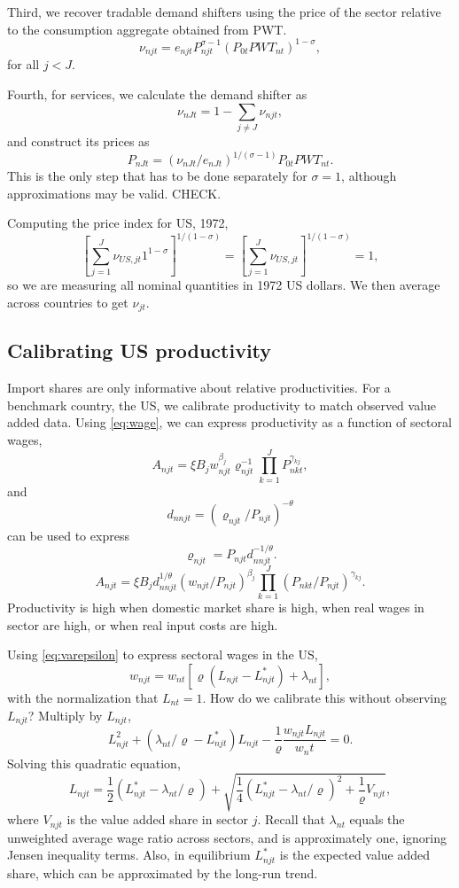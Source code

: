\documentclass[12pt]{article}
\begin{document}
Third, we recover tradable demand shifters using the price of the sector relative to the consumption aggregate obtained from PWT.
\[
\nu_{njt} = e_{njt} P_{njt}^{\sigma-1} (P_{0t}PWT_{nt})^{1-\sigma},
\]
for all $j<J$.

Fourth, for services, we calculate the demand shifter as 
\[
\nu_{nJt} = 1-\sum_{j\neq J}\nu_{njt},
\]
and construct its prices as
\[
P_{nJt} = (\nu_{nJt}/e_{nJt})^{1/(\sigma-1)} P_{0t}PWT_{nt}.
\]
This is the only step that has to be done separately for $\sigma=1$, although approximations may be valid. CHECK.

Computing the price index for US, 1972,
\begin{equation}
	\left[\sum_{j=1}^J \nu_{US,jt} 1^{1-\sigma}\right]^{1/(1-\sigma)} = 
	\left[\sum_{j=1}^J \nu_{US,jt}\right]^{1/(1-\sigma)}
 =1,
\end{equation}
so we are measuring all nominal quantities in 1972 US dollars. We then average across countries to get $\nu_{jt}$.

\subsection{Calibrating US productivity}
Import shares are only informative about relative productivities. For a benchmark country, the US, we calibrate productivity to match observed value added data. Using \eqref{eq:wage}, we can express productivity as a function of sectoral wages,
\begin{equation*}\label{eq:value_added}
A_{njt} =
	\xi B_j
	w_{njt}^{\beta_j}
	\varrho_{njt}^{-1}  	
	\prod_{k=1}^J P_{nkt}^{\gamma_{kj}},
\end{equation*}
and
\[
d_{nnjt} = (\varrho_{njt}/P_{njt})^{-\theta}
\]
can be used to express
\[
\varrho_{njt} = P_{njt} d_{nnjt}^{-1/\theta}.
\]
\begin{equation}\label{eq:productivity}
A_{njt} =
	\xi B_j
	d_{nnjt}^{1/\theta}
	(w_{njt}/P_{njt})^{\beta_j}
 	\prod_{k=1}^J (P_{nkt}/P_{njt})^{\gamma_{kj}}.
\end{equation}
Productivity is high when domestic market share is high, when real wages in sector are high, or when real input costs are high.

Using \eqref{eq:varepsilon} to express sectoral wages in the US,
\[
w_{njt} = w_{nt}
\left[
 {\varrho(L_{njt}-L_{njt}^*)}
+\lambda_{nt}
\right],
\]
with the normalization that $L_{nt}=1$.
How do we calibrate this without observing $L_{njt}$? Multiply by $L_{njt}$,
\[
L_{njt}^2 + (\lambda_{nt}/\varrho-L_{njt}^*) L_{njt} - \frac1\varrho
\frac{w_{njt}L_{njt}} {w_nt} = 0.
\]
Solving this quadratic equation,
\[
L_{njt} = \frac12 (L_{njt}^* - \lambda_{nt}/\varrho)
+ \sqrt{\frac14 (L_{njt}^* - \lambda_{nt}/\varrho)^2 + \frac1\varrho V_{njt}},
\]
where $V_{njt}$ is the value added share in sector $j$. Recall that $\lambda_{nt}$ equals the unweighted average wage ratio across sectors, and is approximately one, ignoring Jensen inequality terms. Also, in equilibrium $L_{njt}^*$ is the expected value added share, which can be approximated by the long-run trend.
\end{document}
